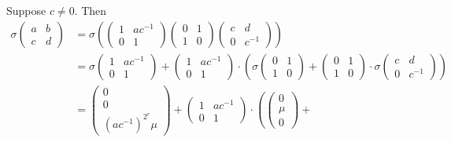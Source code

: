 	Suppose $c\neq 0$. Then
	\begin{align}
	\sigma
			\left(\begin{matrix}a & b \\ c & d\end{matrix}\right)
			 &=
	\sigma\left(
			\left(\begin{matrix} 1 & ac^{-1} \\ 0 & 1 \end{matrix}\right)
			\left(\begin{matrix} 0 & 1 \\ 1 & 0 \end{matrix}\right)
			\left(\begin{matrix} c & d \\ 0 & c^{-1} \end{matrix}\right)
			\right) \nonumber \\
		&=
	\sigma
			\left(\begin{matrix} 1 & ac^{-1} \\ 0 & 1 \end{matrix}\right)
			 + 
	\left(\begin{matrix} 1 & ac^{-1} \\ 0 & 1 \end{matrix}\right)\cdot
	\left(
			\sigma
				\left(\begin{matrix} 0 & 1 \\ 1 & 0 \end{matrix}\right)
				 +
			\left(\begin{matrix} 0 & 1 \\ 1 & 0 \end{matrix}\right)\cdot
			\sigma
				\left(\begin{matrix} c & d \\ 0 & c^{-1} \end{matrix}\right)
			\right)\nonumber \\
		&=
			\left(\begin{matrix} 0 \\ 0 \\ (ac^{-1})^{2^r}\mu\end{matrix}\right)
			 + 
	\left(\begin{matrix} 1 & ac^{-1} \\ 0 & 1 \end{matrix}\right)\cdot
	\left(
				\left(\begin{matrix} 0 \\ \mu \\ 0 \end{matrix}\right)
				 +

\end{align}
